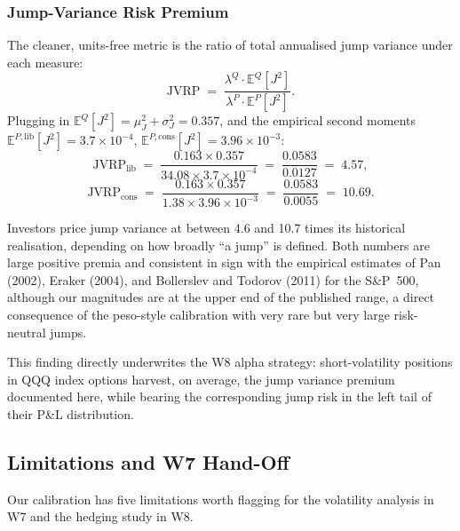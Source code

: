 \documentclass[11pt,a4paper]{article}
\begin{document}
\subsubsection*{Jump-Variance Risk Premium}

The cleaner, units-free metric is the ratio of total annualised jump
variance under each measure:
\[
   \text{JVRP} \;=\;
   \frac{\lambda^Q \cdot \mathbb{E}^Q[J^2]}
        {\lambda^P \cdot \mathbb{E}^P[J^2]}.
\]
Plugging in $\mathbb{E}^Q[J^2] = \mu_J^2 + \sigma_J^2 = 0.357$, and the
empirical second moments $\mathbb{E}^{P,\text{lib}}[J^2] =
3.7 \times 10^{-4}$, $\mathbb{E}^{P,\text{cons}}[J^2] = 3.96 \times
10^{-3}$:
\[
   \text{JVRP}_{\text{lib}}  \;=\;
      \frac{0.163 \times 0.357}{34.08 \times 3.7 \times 10^{-4}}
      \;=\; \frac{0.0583}{0.0127} \;=\; 4.57,
\]
\[
   \text{JVRP}_{\text{cons}} \;=\;
      \frac{0.163 \times 0.357}{1.38 \times 3.96 \times 10^{-3}}
      \;=\; \frac{0.0583}{0.0055} \;=\; 10.69.
\]

Investors price jump variance at between 4.6 and 10.7 times its
historical realisation, depending on how broadly ``a jump'' is defined.
Both numbers are large positive premia and consistent in sign with the
empirical estimates of Pan (2002), Eraker (2004), and Bollerslev and
Todorov (2011) for the S\&P~500, although our magnitudes are at the
upper end of the published range, a direct consequence of the
peso-style calibration with very rare but very large risk-neutral
jumps.

This finding directly underwrites the W8 alpha strategy:
short-volatility positions in QQQ index options harvest, on average,
the jump variance premium documented here, while bearing the
corresponding jump risk in the left tail of their P\&L distribution.


\subsection*{Limitations and W7 Hand-Off}

Our calibration has five limitations worth flagging for the volatility
analysis in W7 and the hedging study in W8.
\end{document}
